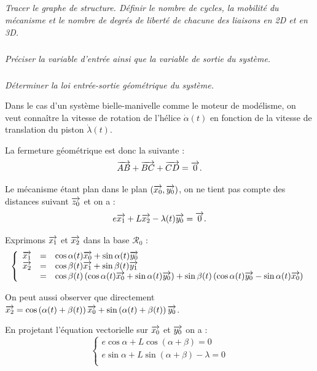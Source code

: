 \documentclass[10pt,fleqn]{article} %
\begin{document}
\begin{multicols}{2}
\subparagraph{}\textit{Tracer le graphe de structure. Définir le nombre de cycles, la mobilité du mécanisme et le nombre de degrés de liberté de chacune des liaisons en 2D et en 3D.}


\subparagraph{}\textit{Préciser la variable d'entrée ainsi que la variable de sortie du système.}

\subparagraph{}\textit{Déterminer la loi entrée-sortie géométrique du système.}
\ifprof 
\begin{corrige} 

Dans le cas d'un système bielle-manivelle comme le moteur de modélisme, on veut connaître la vitesse de rotation de l'hélice $\dot{\alpha}(t)$ en fonction de la vitesse de translation du piston $\dot{\lambda}(t)$. 

La fermeture géométrique est donc la suivante : 
$$\overrightarrow{AB} + \overrightarrow{BC} +\overrightarrow{CD} = \overrightarrow{0}.$$

Le mécanisme étant plan dans le plan $\left(\overrightarrow{x_0},\overrightarrow{y_0}\right)$, on ne tient pas compte des distances suivant $\overrightarrow{z_0}$ et on a : 
$$e\overrightarrow{x_1}+L\overrightarrow{x_2}-\lambda(t)\overrightarrow{y_0}= \overrightarrow{0}.$$



Exprimons $\overrightarrow{x_1}$ et $\overrightarrow{x_2}$ dans la base $\mathcal{R}_0$ :
$$
\left\{
\begin{array}{lcl}
\overrightarrow{x_1} & = & \cos \alpha(t) \overrightarrow{x_0} + \sin \alpha(t) \overrightarrow{y_0} \\
\overrightarrow{x_2} & = & \cos \beta(t) \overrightarrow{x_1} + \sin \beta(t) \overrightarrow{y_1} \\
 & = & \cos \beta(t) \left( \cos \alpha(t) \overrightarrow{x_0} + \sin \alpha(t) \overrightarrow{y_0} \right) + 
\sin \beta(t) \left( \cos \alpha(t) \overrightarrow{y_0} - \sin \alpha(t) \overrightarrow{x_0} \right) \\
\end{array}
\right.
$$

On peut aussi observer que directement 
$\overrightarrow{x_2} =\cos\left(\alpha(t)+\beta(t) \right)\overrightarrow{x_0} + \sin\left(\alpha(t)+\beta(t) \right)\overrightarrow{y_0}$.

En projetant l'équation vectorielle sur $\overrightarrow{x_0}$ et $\overrightarrow{y_0}$ on a : 
$$
\left\{
\begin{array}{l}
e\cos\alpha+ L \cos\left(\alpha+\beta\right)  = 0 \\
e\sin\alpha +  L \sin\left(\alpha+\beta \right) - \lambda= 0 \\
\end{array}
\right.
$$


\end{corrige}
\end{multicols}
\end{document}
